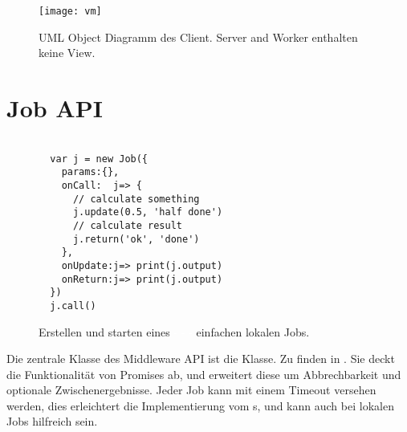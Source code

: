 \begin{wrapfigure}{r}{1\textwidth}
  \begin{center}
    \texttt{[image: vm]}
  \end{center}
  \label{deploy}
  \label{viewModel}
  \caption{UML Object Diagramm des Client. Server and Worker enthalten keine View. }
\end{wrapfigure}



















\clearpage
\section{Job API}
\label{JobInterface}
\begin{wrapfigure}{r}[10mm]{0.45\textwidth}
  \vspace{-10mm}

  \begin{center}
    \begin{Verbatim}

  var j = new Job({
    params:{},
    onCall:  j=> {
      // calculate something
      j.update(0.5, 'half done')
      // calculate result
      j.return('ok', 'done')
    },
    onUpdate:j=> print(j.output)
    onReturn:j=> print(j.output)
  })
  j.call()

    \end{Verbatim}
  \end{center}
  \caption{Erstellen und starten eines \textcolor{White}{- - -} \protect\linebreak einfachen lokalen Jobs.}
  \label{codejob}
\end{wrapfigure}





Die zentrale Klasse des Middleware API ist die  Klasse.
Zu finden in .
Sie deckt die Funktionalität von \JavaScript Promises ab, und erweitert diese um Abbrechbarkeit und optionale Zwischenergebnisse.
Jeder Job kann mit einem Timeout versehen werden, dies erleichtert die Implementierung vom \remoteJob s, und kann auch bei lokalen Jobs hilfreich sein.

